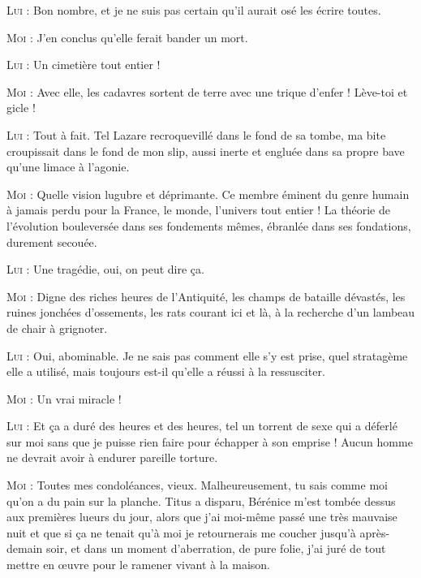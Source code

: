 \begin{dialogue}
\textsc{Lui} : Bon nombre, et je ne suis pas certain qu’il aurait osé les écrire toutes.

\textsc{Moi} : J’en conclus qu’elle ferait bander un mort.

\textsc{Lui} : Un cimetière tout entier !

\textsc{Moi} : Avec elle, les cadavres sortent de terre avec une trique d’enfer ! Lève-toi et gicle !

\textsc{Lui} : Tout à fait. Tel Lazare recroquevillé dans le fond de sa tombe, ma bite croupissait dans le fond de mon slip, aussi inerte et engluée dans sa propre bave qu’une limace à l’agonie.

\textsc{Moi} : Quelle vision lugubre et déprimante. Ce membre éminent du genre humain à jamais perdu pour la France, le monde, l’univers tout entier ! La théorie de l’évolution bouleversée dans ses fondements mêmes, ébranlée dans ses fondations, durement secouée.

\textsc{Lui} : Une tragédie, oui, on peut dire ça.

\textsc{Moi} : Digne des riches heures de l’Antiquité, les champs de bataille dévastés, les ruines jonchées d’ossements, les rats courant ici et là, à la recherche d’un lambeau de chair à grignoter.

\textsc{Lui} : Oui, abominable. Je ne sais pas comment elle s’y est prise, quel stratagème elle a utilisé, mais toujours est-il qu’elle a réussi à la ressusciter.

\textsc{Moi} : Un vrai miracle !

\textsc{Lui} : Et ça a duré des heures et des heures, tel un torrent de sexe qui a déferlé sur moi sans que je puisse rien faire pour échapper à son emprise ! Aucun homme ne devrait avoir à endurer pareille torture.

\textsc{Moi} : Toutes mes condoléances, vieux. Malheureusement, tu sais comme moi qu’on a du pain sur la planche. Titus a disparu, Bérénice m’est tombée dessus aux premières lueurs du jour, alors que j’ai moi-même passé une très mauvaise nuit et que si ça ne tenait qu’à moi je retournerais me coucher jusqu’à après-demain soir, et dans un moment d’aberration, de pure folie, j’ai juré de tout mettre en œuvre pour le ramener vivant à la maison.


\end{dialogue}
